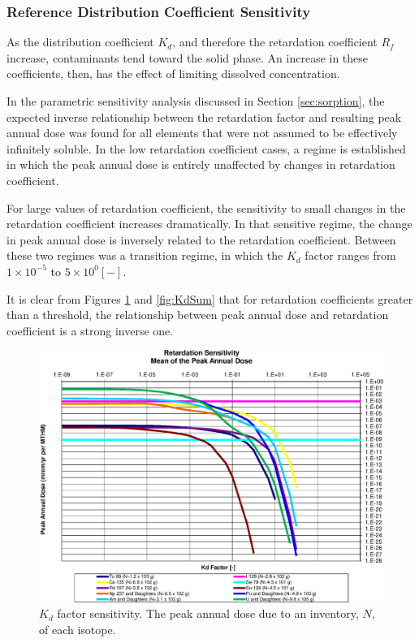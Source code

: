 
\subsubsection{Reference Distribution Coefficient Sensitivity}

As the distribution coefficient $K_d$, and therefore the retardation 
coefficient $R_f$ increase, contaminants tend toward the solid phase. An 
increase in these coefficients, then, has the effect of limiting dissolved 
concentration.  

In the parametric sensitivity analysis discussed in Section \ref{sec:sorption}, 
the expected inverse relationship between the retardation factor and resulting 
peak annual dose was found for all elements that were not assumed to be 
effectively infinitely soluble.  In the low retardation coefficient cases, a 
regime is established in which the peak annual dose is entirely unaffected by 
changes in retardation coefficient. 

For large values of retardation coefficient, the sensitivity to small changes 
in the retardation coefficient increases dramatically. In that sensitive 
regime, the change in peak annual dose is inversely related to the retardation 
coefficient. Between these two regimes was a transition regime, in which the 
$K_d$ factor ranges from $1\times10^{-5}$ to $5\times10^{0} [-]$.

It is clear from Figures \ref{fig:KdSumFactor} and \ref{fig:KdSum} that 
for retardation coefficients greater than a threshold, the 
relationship between peak annual dose and retardation coefficient is a strong 
inverse one. 

\begin{figure}[ht]
\centering
\includegraphics[width=0.7\linewidth]{./chapters/nuclide_sensitivity/clay/Sorption/Retardation_Summary_kdFactor.eps}
\caption[$K_d$ factor sensitivity]{$K_d$ factor sensitivity.  
The peak annual dose due to an inventory, 
$N$, of each isotope.}
\label{fig:KdSumFactor}
\end{figure}

